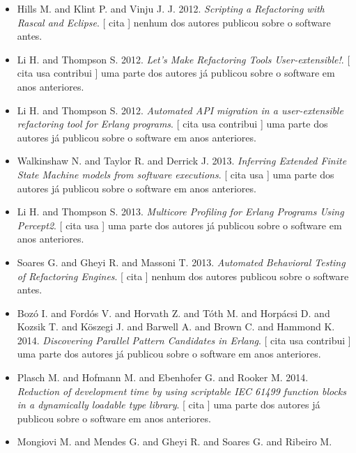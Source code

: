 \begin{itemize}
      [
          cita
      ]
nenhum dos autores publicou sobre o software antes.
\item Hills M. and Klint P. and Vinju J. J.
      2012.
        \textit{ Scripting a Refactoring with Rascal and Eclipse}.
      [
          cita
      ]
nenhum dos autores publicou sobre o software antes.
\item Li H. and Thompson S.
      2012.
        \textit{ Let's Make Refactoring Tools User-extensible!}.
      [
          cita
          usa
          contribui
      ]
uma parte dos autores já publicou sobre o software em anos anteriores.
\item Li H. and Thompson S.
      2012.
        \textit{ Automated API migration in a user-extensible refactoring tool for Erlang programs}.
      [
          cita
          usa
          contribui
      ]
uma parte dos autores já publicou sobre o software em anos anteriores.
\item Walkinshaw N. and Taylor R. and Derrick J.
      2013.
        \textit{ Inferring Extended Finite State Machine models from software executions}.
      [
          cita
          usa
      ]
uma parte dos autores já publicou sobre o software em anos anteriores.
\item Li H. and Thompson S.
      2013.
        \textit{ Multicore Profiling for Erlang Programs Using Percept2}.
      [
          cita
          usa
      ]
uma parte dos autores já publicou sobre o software em anos anteriores.
\item Soares G. and Gheyi R. and Massoni T.
      2013.
        \textit{ Automated Behavioral Testing of Refactoring Engines}.
      [
          cita
      ]
nenhum dos autores publicou sobre o software antes.
\item Boz\'{o} I. and Ford\'{o}s V. and Horvath Z. and T\'{o}th M. and Horp\'{a}csi D. and Kozsik T. and K\"{o}szegi J. and Barwell A. and Brown C. and Hammond K.
      2014.
        \textit{ Discovering Parallel Pattern Candidates in Erlang}.
      [
          cita
          usa
          contribui
      ]
uma parte dos autores já publicou sobre o software em anos anteriores.
\item Plasch M. and Hofmann M. and Ebenhofer G. and Rooker M.
      2014.
        \textit{ Reduction of development time by using scriptable IEC 61499 function blocks in a dynamically loadable type library}.
      [
          cita
      ]
uma parte dos autores já publicou sobre o software em anos anteriores.
\item Mongiovi M. and Mendes G. and Gheyi R. and Soares G. and Ribeiro M.

\end{itemize}
